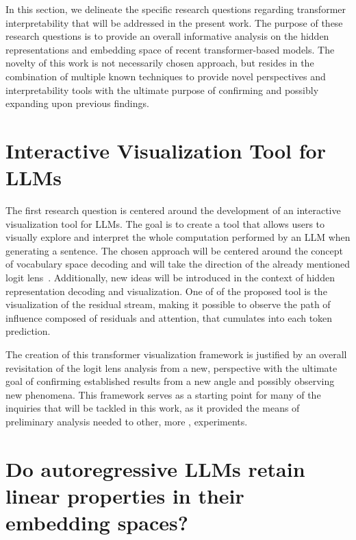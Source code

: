 In this section, we delineate the specific research questions regarding transformer interpretability that will be addressed in the present work.
The purpose of these research questions is to provide an overall informative analysis on the hidden representations and embedding space of recent transformer-based models.
The novelty of this work is not necessarily  chosen approach, but resides in the combination of multiple known techniques to provide novel perspectives and interpretability tools with the ultimate purpose of confirming and possibly expanding upon previous findings.

\section{Interactive Visualization Tool for LLMs}\label{sec:rq_intravisto}


The first research question is centered around the development of an interactive visualization tool for LLMs.
The goal is to create a tool that allows users to visually explore and interpret the whole computation performed by an LLM when generating a sentence.
The chosen approach will be centered around the concept of vocabulary space decoding and will take the direction of the already mentioned logit lens~\cite{nostalgebraist2020}.
Additionally, new ideas will be introduced in the context of hidden representation decoding and visualization.
One of  of the proposed tool is the visualization of the residual stream, making it possible to observe the path of influence composed of residuals and attention, that cumulates into each token prediction.

The creation of this transformer visualization framework is justified by an overall revisitation of the logit lens analysis from a new,  perspective with the ultimate goal of confirming established results from a new angle and possibly observing new phenomena.
This framework serves as a starting point for many of the inquiries that will be tackled in this work, as it provided the means of preliminary analysis needed to  other, more , experiments.

\section{Do autoregressive LLMs retain linear properties in their embedding spaces?}\label{sec:rq_embeddings}

